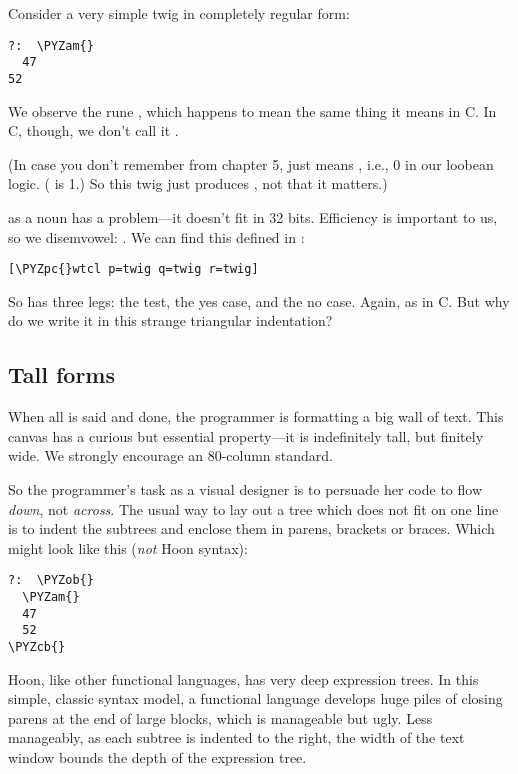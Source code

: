 Consider a very simple twig in completely regular form:

\begin{framed_shaded}
\begin{Verbatim}[fontsize=\relsize{-2.5},fontseries=b,commandchars=\\\{\}]
?:  \PYZam{}
  47
52
\end{Verbatim}
\end{framed_shaded}
We observe the rune , which happens to mean the same thing it
means in C.  In C, though, we don't call it .

(In case you don't remember from chapter 5, \kode{\&} just means , 
i.e., 0 in our loobean logic.  (\kode{\textbar{}} is 1.)  So this twig just
produces , not that it matters.)

 as a noun has a problem---it doesn't fit in 32 bits.
Efficiency is important to us, so we disemvowel: .  We
can find this defined in :

\begin{framed_shaded}
\begin{Verbatim}[fontsize=\relsize{-2.5},fontseries=b,commandchars=\\\{\}]
[\PYZpc{}wtcl p=twig q=twig r=twig]
\end{Verbatim}
\end{framed_shaded}
So  has three legs: the test, the yes case, and the no
case.  Again, as in C.  But why do we write it in this strange
triangular indentation?

\subsection{Tall forms}

When all is said and done, the programmer is formatting a big
wall of text.  This canvas has a curious but essential property---it is indefinitely tall, but finitely wide.  We strongly
encourage an 80-column standard.

So the programmer's task as a visual designer is to persuade her
code to flow \emph{down}, not \emph{across}.  The usual way to lay out a
tree which does not fit on one line is to indent the subtrees
and enclose them in parens, brackets or braces.  Which might look
like this (\emph{not} Hoon syntax):

\begin{framed_shaded}
\begin{Verbatim}[fontsize=\relsize{-2.5},fontseries=b,commandchars=\\\{\}]
?:  \PYZob{}
  \PYZam{}
  47
  52
\PYZcb{}
\end{Verbatim}
\end{framed_shaded}
Hoon, like other functional languages, has very deep expression
trees.  In this simple, classic syntax model, a functional
language develops huge piles of closing parens at the end of
large blocks, which is manageable but ugly.  Less manageably, as
each subtree is indented to the right, the width of the text
window bounds the depth of the expression tree.

